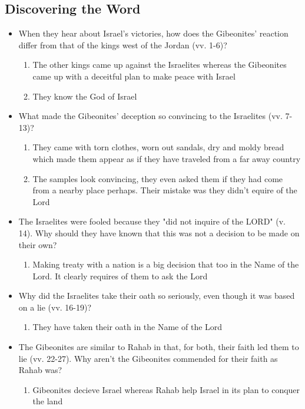 \documentclass[11pt]{article}
\begin{document}
\subsection{Discovering the Word}
\label{sec:org6149bbe}

\begin{itemize}
\item When they hear about Israel's victories, how does the Gibeonites'
reaction differ from that of the kings west of the Jordan (vv. 1-6)?
\begin{enumerate}
\item The other kings came up against the Israelites whereas the
Gibeonites came up with a deceitful plan to make peace with
Israel
\item They know the God of Israel
\end{enumerate}

\item What made the Gibeonites' deception so convincing to the Israelites
(vv. 7-13)?
\begin{enumerate}
\item They came with torn clothes, worn out sandals, dry and moldy
bread which made them appear as if they have traveled from a far
away country

\item The samples look convincing, they even asked them if they had
come from a nearby place perhaps. Their mistake was they didn't
equire of the Lord
\end{enumerate}

\item The Israelites were fooled because they "did not inquire of the
LORD" (v. 14). Why should they have known that this was not a
decision to be made on their own?
\begin{enumerate}
\item Making treaty with a nation is a big decision that too in the
Name of the Lord. It clearly requires of them to ask the Lord
\end{enumerate}

\item Why did the Israelites take their oath so seriously, even though it
was based on a lie (vv. 16-19)?
\begin{enumerate}
\item They have taken their oath in the Name of the Lord
\end{enumerate}

\item The Gibeonites are similar to Rahab in that, for both, their faith
led them to lie (vv. 22-27). Why aren't the Gibeonites commended for
their faith as Rahab was?
\begin{enumerate}
\item Gibeonites decieve Israel whereas Rahab help Israel in its plan
to conquer the land
\end{enumerate}
\end{itemize}
\end{document}
